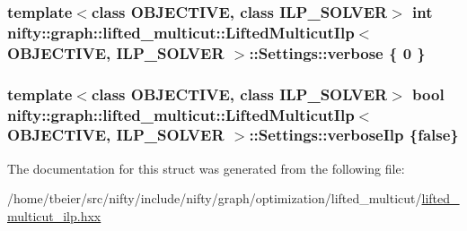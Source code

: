 \subsubsection[{verbose}]{\setlength{\rightskip}{0pt plus 5cm}template$<$class O\+B\+J\+E\+C\+T\+I\+V\+E, class I\+L\+P\+\_\+\+S\+O\+L\+V\+E\+R$>$ int {\bf nifty\+::graph\+::lifted\+\_\+multicut\+::\+Lifted\+Multicut\+Ilp}$<$ O\+B\+J\+E\+C\+T\+I\+V\+E, I\+L\+P\+\_\+\+S\+O\+L\+V\+E\+R $>$\+::Settings\+::verbose \{ 0 \}}\label{structnifty_1_1graph_1_1lifted__multicut_1_1LiftedMulticutIlp_1_1Settings_aba3639b15a40ae83625329c0c2c8515a}
\hypertarget{structnifty_1_1graph_1_1lifted__multicut_1_1LiftedMulticutIlp_1_1Settings_a07d81750dca3eee9de46938032aede72}{}
\subsubsection[{verbose\+Ilp}]{\setlength{\rightskip}{0pt plus 5cm}template$<$class O\+B\+J\+E\+C\+T\+I\+V\+E, class I\+L\+P\+\_\+\+S\+O\+L\+V\+E\+R$>$ bool {\bf nifty\+::graph\+::lifted\+\_\+multicut\+::\+Lifted\+Multicut\+Ilp}$<$ O\+B\+J\+E\+C\+T\+I\+V\+E, I\+L\+P\+\_\+\+S\+O\+L\+V\+E\+R $>$\+::Settings\+::verbose\+Ilp \{false\}}\label{structnifty_1_1graph_1_1lifted__multicut_1_1LiftedMulticutIlp_1_1Settings_a07d81750dca3eee9de46938032aede72}


The documentation for this struct was generated from the following file\+:\begin{DoxyCompactItemize}
\item 
/home/tbeier/src/nifty/include/nifty/graph/optimization/lifted\+\_\+multicut/\hyperlink{lifted__multicut__ilp_8hxx}{lifted\+\_\+multicut\+\_\+ilp.\+hxx}\end{DoxyCompactItemize}
